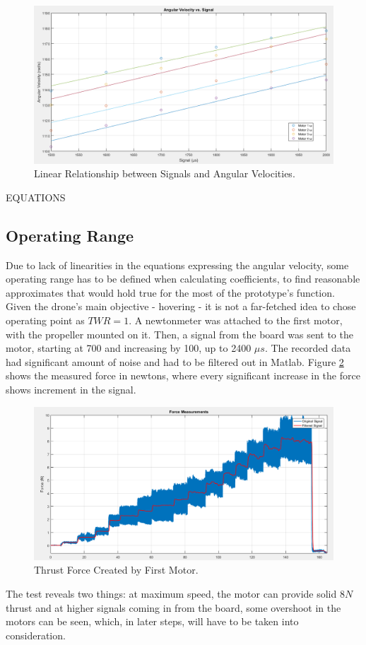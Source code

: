 \begin{figure}[H]
  \centering
    \includegraphics[width=1\textwidth]{images/polyfits.png}
	\caption{Linear Relationship between Signals and Angular Velocities.}
	\label{RadsTrendline}
\end{figure}

EQUATIONS

\subsection{Operating Range}
Due to lack of linearities in the equations expressing the angular velocity, some operating range has to be defined when calculating coefficients, to find reasonable approximates that would hold true for the most of the prototype's function. Given the drone's main objective - hovering - it is not a far-fetched idea to chose operating point as $TWR = 1$. A newtonmeter was attached to the first motor, with the propeller mounted on it. Then, a signal from the board was sent to the motor, starting at 700 and increasing by 100, up to 2400 $\mu s$. The recorded data had significant amount of noise and had to be filtered out in Matlab. Figure \ref{forcePlot} shows the measured force in newtons, where every significant increase in the force shows increment in the signal.
\begin{figure}[H]
  \centering
    \includegraphics[width=1\textwidth]{images/forceMeasurements.png}
	\caption{Thrust Force Created by First Motor.}
	\label{forcePlot}
\end{figure}
The test reveals two things: at maximum speed, the motor can provide solid $8N$ thrust and at higher signals coming in from the board, some overshoot in the motors can be seen, which, in later steps, will have to be taken into consideration.

